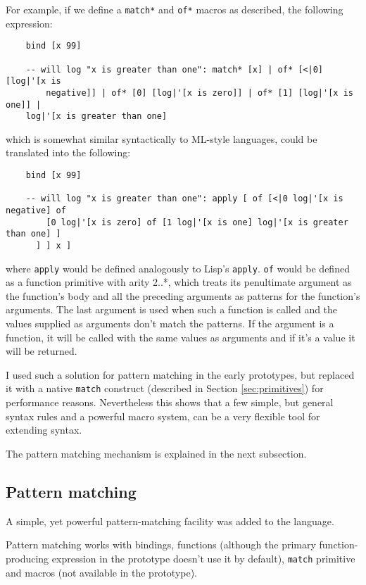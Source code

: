 For example, if we define a \texttt{match*} and \texttt{of*} macros as
described, the following expression:
\begin{lstlisting}
    bind [x 99]
    
    -- will log "x is greater than one": match* [x] | of* [<|0] [log|'[x is
        negative]] | of* [0] [log|'[x is zero]] | of* [1] [log|'[x is one]] |
    log|'[x is greater than one]
\end{lstlisting}

which is somewhat similar syntactically to
ML-style\cite[Section~Algebraic datatypes and pattern matching]{standard_ml_wikipedia}
languages, could be translated into the following:
\begin{lstlisting}
    bind [x 99]
    
    -- will log "x is greater than one": apply [ of [<|0 log|'[x is negative] of
        [0 log|'[x is zero] of [1 log|'[x is one] log|'[x is greater than one] ]
      ] ] x ]
\end{lstlisting}

where \texttt{apply} would be defined analogously to Lisp's
\texttt{apply}. \texttt{of} would be defined as a function primitive with arity
2..*, which treats its penultimate argument as the function's body and all the
preceding arguments as patterns for the function's arguments. The last argument
is used when such a function is called and the values supplied as arguments
don't match the patterns. If the argument is a function, it will be called with
the same values as arguments and if it's a value it will be returned.

I used such a solution for pattern matching in the early prototypes, but
replaced it with a native \texttt{match} construct (described in Section
\ref{sec:primitives}) for performance reasons. Nevertheless this shows that a
few simple, but general syntax rules and a powerful macro system, can be a very
flexible tool for extending syntax.

The pattern matching mechanism is explained in the next subsection.

\subsection{Pattern matching}
A simple, yet powerful pattern-matching facility was added to the language.

Pattern matching works with bindings, functions (although the primary
function-producing expression in the prototype doesn't use it by default),
\texttt{match} primitive and macros (not available in the prototype).

